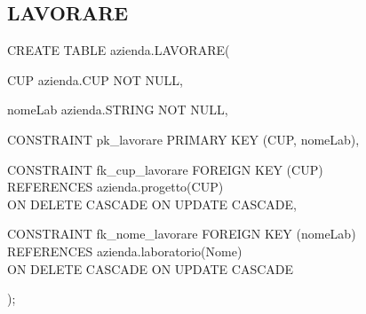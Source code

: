         \subsection{LAVORARE}
            \ttfamily
                \begin{flushleft}
                    \begin{description}
                        \item CREATE TABLE azienda.LAVORARE(                
                        \begin{description}
                            \item CUP azienda.CUP NOT NULL,
                            \item nomeLab azienda.STRING NOT NULL,
                            
                            \vspace{0.5cm}

                            \item CONSTRAINT pk\_lavorare PRIMARY KEY (CUP, nomeLab),
                            \item CONSTRAINT fk\_cup\_lavorare FOREIGN KEY (CUP)\\
                            REFERENCES azienda.progetto(CUP)\\
                            ON DELETE CASCADE	    ON UPDATE CASCADE,
                            \item CONSTRAINT fk\_nome\_lavorare FOREIGN KEY (nomeLab)\\
                            REFERENCES azienda.laboratorio(Nome)\\
                            ON DELETE CASCADE	ON UPDATE CASCADE
                        \end{description}
                        );
                    \end{description}
                \end{flushleft}
            \normalfont

